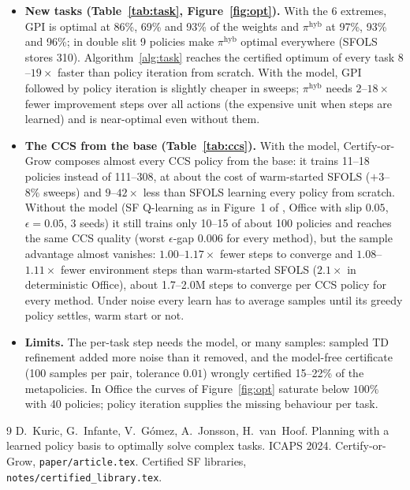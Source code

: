 \documentclass[11pt]{article}
\begin{document}
\begin{itemize}\setlength\itemsep{2pt}
\item \textbf{New tasks (Table~\ref{tab:task}, Figure~\ref{fig:opt}).} With the 6 extremes, GPI is optimal at 86\%,
69\% and 93\% of the weights and $\pi^{\mathrm{hyb}}$ at 97\%, 93\% and 96\%; in double slit 9 policies make
$\pi^{\mathrm{hyb}}$ optimal everywhere (SFOLS stores 310). Algorithm~\ref{alg:task} reaches the certified optimum of
every task $8$--$19\times$ faster than policy iteration from scratch. With the model, GPI followed by policy iteration is
slightly cheaper in sweeps; $\pi^{\mathrm{hyb}}$ needs $2$--$18\times$ fewer improvement steps over all actions (the
expensive unit when steps are learned) and is near-optimal even without them.
\item \textbf{The CCS from the base (Table~\ref{tab:ccs}).} With the model, Certify-or-Grow composes almost every
CCS policy from the base: it trains 11--18 policies instead of 111--308, at about the cost of warm-started SFOLS
($+3$--$8\%$ sweeps) and $9$--$42\times$ less than SFOLS learning every policy from scratch. Without the model (SF
Q-learning as in Figure~1 of \cite{cog}, Office with slip $0.05$, $\epsilon=0.05$, 3 seeds) it still trains only
10--15 of about 100 policies and reaches the same CCS quality (worst $\epsilon$-gap $0.006$ for every method), but
the sample advantage almost vanishes: $1.00$--$1.17\times$ fewer steps to converge and $1.08$--$1.11\times$ fewer
environment steps than warm-started SFOLS ($2.1\times$ in deterministic Office), about 1.7--2.0M steps to converge per
CCS policy for every method. Under noise every learn has to average samples until its greedy policy settles, warm start or not.
\item \textbf{Limits.} The per-task step needs the model, or many samples: sampled TD refinement added more noise
than it removed, and the model-free certificate (100 samples per pair, tolerance $0.01$) wrongly certified
15--22\% of the metapolicies. In Office the curves of Figure~\ref{fig:opt} saturate below $100\%$
with 40 policies; policy iteration supplies the missing behaviour per task.
\end{itemize}

{\small
\begin{thebibliography}{9}\setlength\itemsep{0pt}
 D.~Kuric, G.~Infante, V.~G\'omez, A.~Jonsson, H.~van~Hoof. Planning with a learned policy basis to
optimally solve complex tasks. ICAPS 2024.
 Certify-or-Grow, \texttt{paper/article.tex}.
 Certified SF libraries, \texttt{notes/certified\_library.tex}.
\end{thebibliography}}
\end{document}
